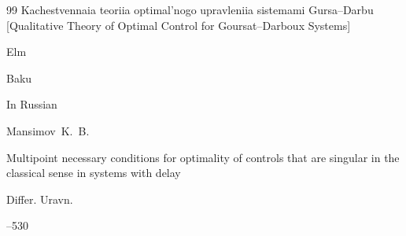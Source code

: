 \begin{thebibliography}{99}
\book Kachestvennaia teoriia optimal'nogo upravleniia sistemami Gursa--Darbu \rm [Qualitative Theory of Optimal Control for Goursat--Darboux Systems]


\publ Elm

\publaddr Baku







\lang In Russian

\by Mansimov~K.~B.

\paper Multipoint necessary conditions for optimality of controls that are singular in the classical sense in systems with delay

\jour Differ. Uravn.




--530







\end{thebibliography}



%




